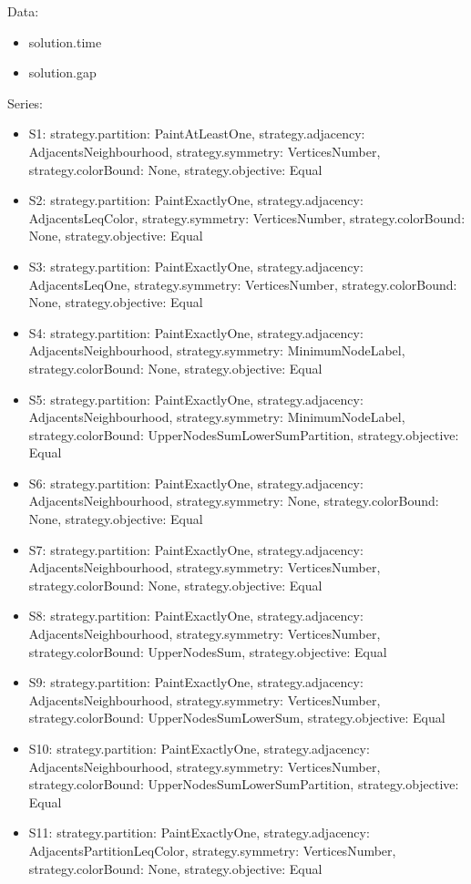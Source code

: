 \documentclass[landscape, 12pt]{report}
\begin{document}
Data:
\begin{itemize}
\item solution.time
\item solution.gap
\end{itemize}
Series:
\begin{itemize}
\item S1: strategy.partition: PaintAtLeastOne, strategy.adjacency: AdjacentsNeighbourhood, strategy.symmetry: VerticesNumber, strategy.colorBound: None, strategy.objective: Equal
\item S2: strategy.partition: PaintExactlyOne, strategy.adjacency: AdjacentsLeqColor, strategy.symmetry: VerticesNumber, strategy.colorBound: None, strategy.objective: Equal
\item S3: strategy.partition: PaintExactlyOne, strategy.adjacency: AdjacentsLeqOne, strategy.symmetry: VerticesNumber, strategy.colorBound: None, strategy.objective: Equal
\item S4: strategy.partition: PaintExactlyOne, strategy.adjacency: AdjacentsNeighbourhood, strategy.symmetry: MinimumNodeLabel, strategy.colorBound: None, strategy.objective: Equal
\item S5: strategy.partition: PaintExactlyOne, strategy.adjacency: AdjacentsNeighbourhood, strategy.symmetry: MinimumNodeLabel, strategy.colorBound: UpperNodesSumLowerSumPartition, strategy.objective: Equal
\item S6: strategy.partition: PaintExactlyOne, strategy.adjacency: AdjacentsNeighbourhood, strategy.symmetry: None, strategy.colorBound: None, strategy.objective: Equal
\item S7: strategy.partition: PaintExactlyOne, strategy.adjacency: AdjacentsNeighbourhood, strategy.symmetry: VerticesNumber, strategy.colorBound: None, strategy.objective: Equal
\item S8: strategy.partition: PaintExactlyOne, strategy.adjacency: AdjacentsNeighbourhood, strategy.symmetry: VerticesNumber, strategy.colorBound: UpperNodesSum, strategy.objective: Equal
\item S9: strategy.partition: PaintExactlyOne, strategy.adjacency: AdjacentsNeighbourhood, strategy.symmetry: VerticesNumber, strategy.colorBound: UpperNodesSumLowerSum, strategy.objective: Equal
\item S10: strategy.partition: PaintExactlyOne, strategy.adjacency: AdjacentsNeighbourhood, strategy.symmetry: VerticesNumber, strategy.colorBound: UpperNodesSumLowerSumPartition, strategy.objective: Equal
\item S11: strategy.partition: PaintExactlyOne, strategy.adjacency: AdjacentsPartitionLeqColor, strategy.symmetry: VerticesNumber, strategy.colorBound: None, strategy.objective: Equal
\end{itemize}
\end{document}
